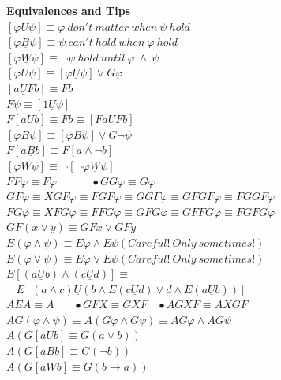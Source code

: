 \documentclass{article}
\begin{document}
\begin{multicols}{4}
\textbf{Equivalences and Tips} \\
$[\varphi \underline{U} \psi] \equiv \varphi\ don't\ matter\ when\ \psi\ hold $ \\
$[\varphi \underline{B} \psi] \equiv \psi\ can't\ hold\ when\ \varphi\ hold $ \\
$[\varphi \underline{W} \psi] \equiv \neg\psi\ hold\ until\ \varphi\ \wedge\ \psi $ \\
$[\varphi U \psi] \equiv [\varphi \underline{U} \psi] \vee G\varphi$ \\
$[a \underline{U} Fb] \equiv Fb $ \\
$F\psi \equiv [1 \underline{U} \psi] $ \\
$F[a \underline{U} b] \equiv Fb \equiv [Fa \underline{U} Fb] $ \\
$[\varphi B \psi] \equiv [\varphi \underline{B} \psi] \vee G\neg\psi$ \\
$F[a \underline{B} b] \equiv F[a \wedge \neg b] $ \\
$[\varphi W \psi] \equiv \neg[\neg\varphi \underline{W} \psi]$ \\
$FF\varphi \equiv F\varphi\ \ \ \ \ \ \ \ \ \ \ \ \ \ \bullet GG\varphi \equiv G\varphi$\\
$GF\varphi \equiv XGF\varphi\equiv FGF\varphi \equiv GGF\varphi\equiv GFGF\varphi \equiv FGGF\varphi$\\
$FG\varphi\equiv XFG\varphi \equiv FFG\varphi \equiv GFG\varphi \equiv GFFG\varphi \equiv FGFG\varphi$ \\
$GF(x \vee y) \equiv GFx \vee GFy $ \\
$E(\varphi \wedge \psi) \equiv E\varphi \wedge E \psi (Careful!\ Only\ sometimes!) $ \\
$E(\varphi \vee \psi) \equiv E\varphi \vee E\psi (Careful!\ Only\ sometimes!)$ \\
$E[(a \underline{U} b) \wedge (c \underline{U} d)] \equiv $ \\
$\ \ \ \ E[(a \wedge c) \underline{U} (b \wedge E(c \underline{U} d) \vee d \wedge E(a \underline{U} b))] $ \\
$AEA \equiv A\ \ \ \ \ \ \ \ \bullet GFX \equiv GXF \ \ \ \ \bullet AGXF\equiv AXGF$ \\
$AG(\varphi \wedge \psi) \equiv A(G\varphi \wedge G\psi) \equiv AG\varphi \wedge AG\psi $ \\
$A(G[a U b] \equiv G(a \vee b))$ \\
$A(G[a B b] \equiv G(\neg b))$ \\
$A(G[a W b] \equiv G(b \rightarrow a))$ \\

\end{multicols}
\end{document}

